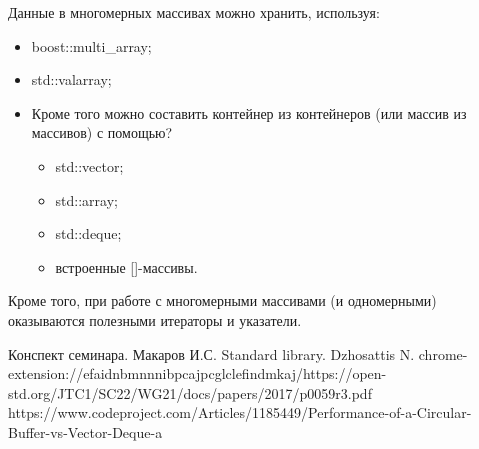 \documentclass[a4paper,12pt]{article}	%
\begin{document}
	Данные в многомерных массивах можно хранить, используя:
	
	\begin{itemize}
	
		\item boost::multi\_array;
		
		\item std::valarray;
		
		\item Кроме того можно составить контейнер из контейнеров (или массив из массивов) с помощью?
		
		\begin{itemize}
		
			\item std::vector;
		
			\item std::array;
		
			\item std::deque;	
			
			\item встроенные []-массивы.

		\end{itemize}	
	\end{itemize}
	
	Кроме того, при работе с многомерными массивами (и одномерными) оказываются полезными	итераторы и указатели.
	
\newpage


 
	\begin{thebibliography}{}
	
		 Конспект семинара. Макаров И.С.
		 Standard library. Dzhosattis N.
		 chrome-extension://efaidnbmnnnibpcajpcglclefindmkaj/https://open-std.org/JTC1/SC22/WG21/docs/papers/2017/p0059r3.pdf
		 https://www.codeproject.com/Articles/1185449/Performance-of-a-Circular-Buffer-vs-Vector-Deque-a
		
	\end{thebibliography}
\end{document}
